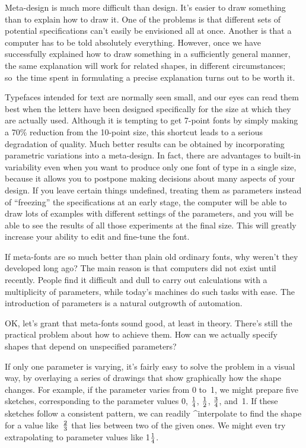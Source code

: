 Meta-design is much more difficult than design. It's easier to draw something
than to explain how to draw it. One of the problems is that different sets
of potential specifications can't easily be envisioned all at once.
Another is that a computer has to be told absolutely everything.
However, once we have successfully explained how to draw something
in a sufficiently general manner, the same explanation will work for
related shapes, in different circumstances; so~the time spent in formulating
a precise explanation turns out to be worth it.

Typefaces intended for text are normally seen small, and our eyes can read
them best when the letters have been designed specifically for the size at
which they are actually used. Although it is tempting to get 7-point fonts
by simply making a 70\% reduction from the 10-point size, this shortcut
leads to a serious degradation of quality. Much better results can be
obtained by incorporating parametric variations into a meta-design.  In
fact, there are advantages to built-in variability even when you want to
produce only one font of type in a single size, because it allows you to
postpone making decisions about many aspects of your design. If you leave
certain things undefined, treating them as parameters instead of
``freezing'' the specifications at an early stage, the computer will be
able to draw lots of examples with different settings of the parameters,
and you will be able to see the results of all those experiments at the final
size. This will greatly increase your ability to edit and fine-tune the font.

If meta-fonts are so much better than plain old ordinary fonts, why weren't
they developed long ago? The main reason is that computers did not exist until
recently. People find it difficult and dull to carry out calculations with
a multiplicity of parameters, while today's machines do such tasks with ease.
The introduction of parameters is a natural outgrowth of automation.

OK, let's grant that meta-fonts sound good, at least in theory. There's still
the practical problem about how to achieve them. How can we actually
specify shapes that depend on unspecified parameters?

If only one parameter is varying, it's fairly easy to solve the problem in
a visual way, by overlaying a series of drawings that show graphically how
the shape changes. For example, if the parameter varies from 0 to~1, we
might prepare five sketches, corresponding to the parameter values 0,
$1\over4$, $1\over2$, $3\over4$, and~1. If these sketches follow a
consistent pattern, we can readily ^{interpolate} to find the shape for a
value like~$2\over3$ that lies between two of the given ones. We might
even try extrapolating to parameter values like 1$1\over4$.

